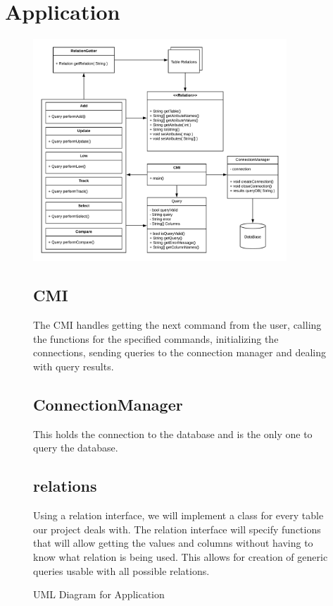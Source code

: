 \documentclass{article}
\begin{document}
	\section{Application}
    \begin{figure}[H]
      \centering
      \includegraphics[width=0.85\textwidth]{UML_Diagram}
      \caption{UML Diagram for Application}
      \label{fig:uml}
	
		\subsection{CMI}
			The CMI handles getting the next command from the user, calling the functions for the specified commands,
			initializing the connections, sending queries to the connection manager and dealing with query results. 
			
		\subsection{ConnectionManager}
			This holds the connection to the database and is the only one to query the database. 
			
		\subsection{relations}
			Using a relation interface, we will implement a class for every table our project deals with. The relation
			interface will specify functions that will allow getting the values and columns without having to know what
			relation is being used. This allows for creation of generic queries usable with all possible relations.
			

\end{figure}
\end{document}
